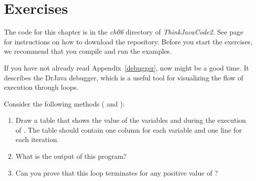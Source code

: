 \section{Exercises}

The code for this chapter is in the {\it ch06} directory of {\it ThinkJavaCode2}.
See page~\pageref{code} for instructions on how to download the repository.
Before you start the exercises, we recommend that you compile and run the examples.

If you have not already read Appendix~\ref{debugger}, now might be a good time.
It describes the DrJava debugger, which is a useful tool for visualizing the flow of execution through loops.


\begin{exercise}  %

Consider the following methods ( and ):

\begin{enumerate}

\item Draw a table that shows the value of the variables  and  during the execution of .
The table should contain one column for each variable and one line for each iteration.

\item What is the output of this program?

\item Can you prove that this loop terminates for any positive value of ?



\end{enumerate}


\end{exercise}


